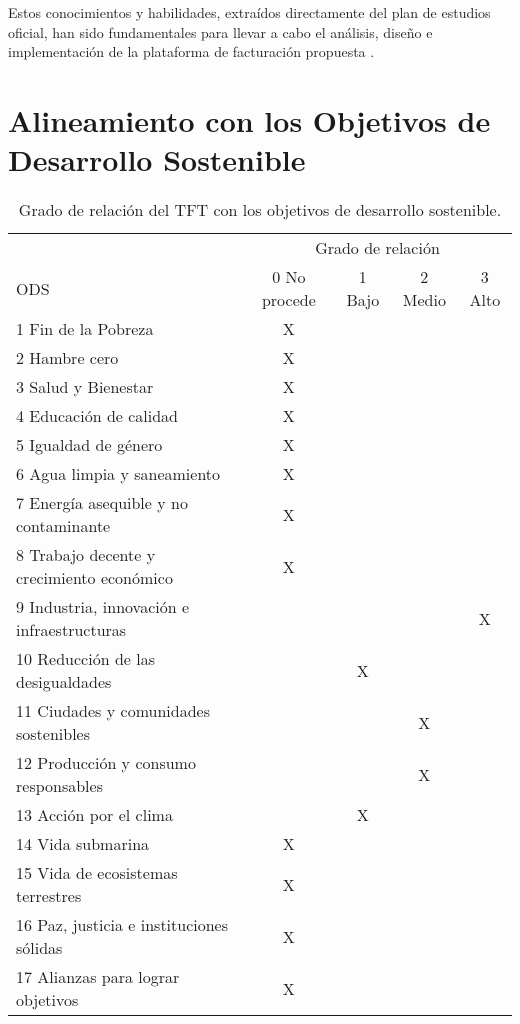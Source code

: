 \begin{large}
Estos conocimientos y habilidades, extraídos directamente del plan de estudios oficial, han sido fundamentales para llevar a cabo el análisis, diseño e implementación de la plataforma de facturación propuesta \cite{grado2024ulpgc}.
\end{large}

\section{Alineamiento con los Objetivos de Desarrollo Sostenible}

\begin{large}
\begin{table}[H]
\caption{Grado de relación del TFT con los objetivos de desarrollo sostenible.}
\label{tab:ODS}
\centering
\begin{tabular}{|l|c|c|c|c|}
\cline{1-5}
 & \multicolumn{4}{c|}{Grado de relación} \\ \cline{2-5}
ODS & 0 No procede & 1 Bajo & 2 Medio & 3 Alto \\ \cline{1-5}
1 Fin de la Pobreza                & X &   &   &   \\ \cline{1-5}
2 Hambre cero                      & X &   &   &   \\ \cline{1-5}
3 Salud y Bienestar                & X &   &   &   \\ \cline{1-5}
4 Educación de calidad             & X &   &   &   \\ \cline{1-5}
5 Igualdad de género               & X &   &   &   \\ \cline{1-5}
6 Agua limpia y saneamiento        & X &   &   &   \\ \cline{1-5}
7 Energía asequible y no contaminante & X &   &   &   \\ \cline{1-5}
8 Trabajo decente y crecimiento económico & X &   &   &   \\ \cline{1-5}
9 Industria, innovación e infraestructuras &   &   &   & X \\ \cline{1-5}
10 Reducción de las desigualdades  &   & X &   &   \\ \cline{1-5}
11 Ciudades y comunidades sostenibles &   &   & X &   \\ \cline{1-5}
12 Producción y consumo responsables &   &   & X &   \\ \cline{1-5} 
13 Acción por el clima             &   & X &   &   \\ \cline{1-5}
14 Vida submarina                  & X &   &   &   \\ \cline{1-5}
15 Vida de ecosistemas terrestres  & X &   &   &   \\ \cline{1-5}
16 Paz, justicia e instituciones sólidas & X &   &   &   \\ \cline{1-5}
17 Alianzas para lograr objetivos  & X &   &   &   \\ \cline{1-5}
\end{tabular}
\end{table}


\end{large}
